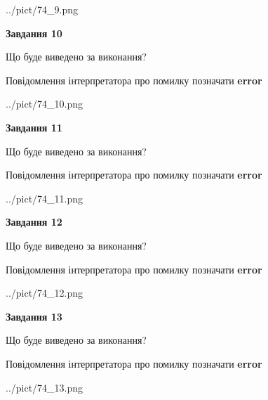 \documentclass[11pt, ukrainian]{article}
\begin{document}
{\begin {large}
\begin{center}
	{../pict/74_9.png}
\end{center}
\newpage

{\begin {center}\textbf{Завдання 10}\end {center}}\par
Що буде виведено за виконання? \par
Повідомлення інтерпретатора про помилку позначати \textbf{error}

\begin{center}
	{../pict/74_10.png}
\end{center}
\newpage

{\begin {center}\textbf{Завдання 11}\end {center}}\par
Що буде виведено за виконання? \par
Повідомлення інтерпретатора про помилку позначати \textbf{error}

\begin{center}
	{../pict/74_11.png}
\end{center}
\newpage

{\begin {center}\textbf{Завдання 12}\end {center}}\par
Що буде виведено за виконання? \par
Повідомлення інтерпретатора про помилку позначати \textbf{error}

\begin{center}
	{../pict/74_12.png}
\end{center}
\newpage

{\begin {center}\textbf{Завдання 13}\end {center}}\par
Що буде виведено за виконання? \par
Повідомлення інтерпретатора про помилку позначати \textbf{error}

\begin{center}
	{../pict/74_13.png}
\end{center}
\newpage


\end{large}}
\end{document}
